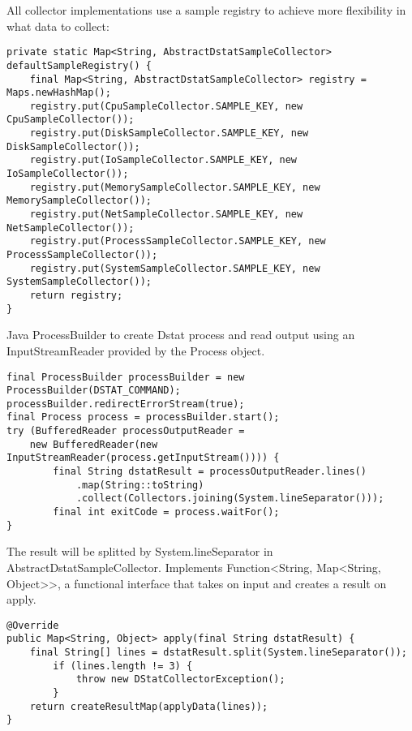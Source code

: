 All collector implementations use a sample registry to achieve more flexibility in what data to collect:
\begin{lstlisting}[caption={Sample registry in "DstatCollector"}, captionpos=b, label={lst:dstatsampleregistry}]
private static Map<String, AbstractDstatSampleCollector> defaultSampleRegistry() {
    final Map<String, AbstractDstatSampleCollector> registry = Maps.newHashMap();
    registry.put(CpuSampleCollector.SAMPLE_KEY, new CpuSampleCollector());
    registry.put(DiskSampleCollector.SAMPLE_KEY, new DiskSampleCollector());
    registry.put(IoSampleCollector.SAMPLE_KEY, new IoSampleCollector());
    registry.put(MemorySampleCollector.SAMPLE_KEY, new MemorySampleCollector());
    registry.put(NetSampleCollector.SAMPLE_KEY, new NetSampleCollector());
    registry.put(ProcessSampleCollector.SAMPLE_KEY, new ProcessSampleCollector());
    registry.put(SystemSampleCollector.SAMPLE_KEY, new SystemSampleCollector());
    return registry;
}
\end{lstlisting}

Java ProcessBuilder to create Dstat process and read output using an InputStreamReader provided by the Process object.
\begin{lstlisting}[caption={ProcessBuilder in "DstatCollector"}, captionpos=b, label={lst:dstatprocessbuilder}]
final ProcessBuilder processBuilder = new ProcessBuilder(DSTAT_COMMAND);
processBuilder.redirectErrorStream(true);
final Process process = processBuilder.start();
try (BufferedReader processOutputReader =
    new BufferedReader(new InputStreamReader(process.getInputStream()))) {
        final String dstatResult = processOutputReader.lines()
            .map(String::toString)
            .collect(Collectors.joining(System.lineSeparator()));
        final int exitCode = process.waitFor();
}
\end{lstlisting}

The result will be splitted by System.lineSeparator in AbstractDstatSampleCollector. Implements Function<String, Map<String, Object>>,
a functional interface that takes on input and creates a result on apply.
\begin{lstlisting}[caption={Split Dstat input in "AbstractDstatSampleCollector"}, captionpos=b, label={lst:dstatsplitdat}]
@Override
public Map<String, Object> apply(final String dstatResult) {
    final String[] lines = dstatResult.split(System.lineSeparator());
        if (lines.length != 3) {
            throw new DStatCollectorException();
        }
    return createResultMap(applyData(lines));
}
\end{lstlisting}

